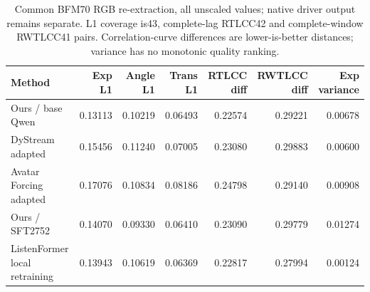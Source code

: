 \begin{table}[t]
\centering\small
\caption{Common BFM70 RGB re-extraction, all unscaled values; native driver output remains separate. L1 coverage is43, complete-lag RTLCC42 and complete-window RWTLCC41 pairs. Correlation-curve differences are lower-is-better distances; variance has no monotonic quality ranking.}
\label{tab:bfm-video}
\setlength{\tabcolsep}{4pt}
\begin{tabular}{lrrrrrr}
\toprule
Method & Exp L1 & Angle L1 & Trans L1 & RTLCC diff & RWTLCC diff & Exp variance \\
\midrule
Ours / base Qwen & 0.13113 & 0.10219 & 0.06493 & 0.22574 & 0.29221 & 0.00678 \\
DyStream adapted & 0.15456 & 0.11240 & 0.07005 & 0.23080 & 0.29883 & 0.00600 \\
Avatar Forcing adapted & 0.17076 & 0.10834 & 0.08186 & 0.24798 & 0.29140 & 0.00908 \\
Ours / SFT2752 & 0.14070 & 0.09330 & 0.06410 & 0.23090 & 0.29779 & 0.01274 \\
ListenFormer local retraining & 0.13943 & 0.10619 & 0.06369 & 0.22817 & 0.27994 & 0.00124 \\
\bottomrule
\end{tabular}
\end{table}
